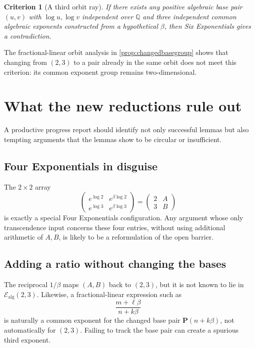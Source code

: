 \documentclass[11pt]{article}
\numberwithin{equation}{section}
\newtheorem{criterion}[theorem]{Criterion}
\theoremstyle{definition}
\newcommand{\Q}{\mathbb{Q}}
\newcommand{\Pair}{\mathbf P}
\newcommand{\Ealg}{\mathcal E_{\mathrm{alg}}}
\begin{document}
\begin{criterion}[A third orbit ray]\label{crit:thirdray}
If there exists any positive algebraic base pair \((u,v)\) with \(\log u,\log v\) independent over \(\Q\) and three independent common algebraic exponents constructed from a hypothetical \(\beta\), then Six Exponentials gives a contradiction.
\end{criterion}

The fractional-linear orbit analysis in \cref{prop:changedbasegroup} shows that changing from \((2,3)\) to a pair already in the same orbit does not meet this criterion: its common exponent group remains two-dimensional.

\section{What the new reductions rule out}

A productive progress report should identify not only successful lemmas but also tempting arguments that the lemmas show to be circular or insufficient.

\subsection{Four Exponentials in disguise}

The \(2\times2\) array
\[
 \begin{pmatrix}
  e^{\log2}&e^{\beta\log2}\\
  e^{\log3}&e^{\beta\log3}
 \end{pmatrix}
 =\begin{pmatrix}2&A\\3&B\end{pmatrix}
\]
is exactly a special Four Exponentials configuration. Any argument whose only transcendence input concerns these four entries, without using additional arithmetic of \(A,B\), is likely to be a reformulation of the open barrier.

\subsection{Adding a ratio without changing the bases}

The reciprocal \(1/\beta\) maps \((A,B)\) back to \((2,3)\), but it is not known to lie in \(\Ealg(2,3)\). Likewise, a fractional-linear expression such as
\[
       \frac{m+\ell\beta}{n+k\beta}
\]
is naturally a common exponent for the changed base pair \(\Pair(n+k\beta)\), not automatically for \((2,3)\). Failing to track the base pair can create a spurious third exponent.
\end{document}
